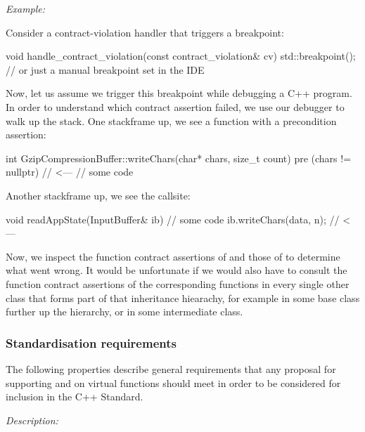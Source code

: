 \emph{Example:}

Consider a contract-violation handler that triggers a breakpoint:

\begin{codeblock}
void handle_contract_violation(const contract_violation& cv) {
    std::breakpoint(); // or just a manual breakpoint set in the IDE
}
\end{codeblock}

Now, let us assume we trigger this breakpoint while debugging a C++ program. In order to understand which contract assertion failed, we use our debugger to walk up the stack.  One stackframe up, we see a function with a precondition assertion:

\begin{codeblock}
int GzipCompressionBuffer::writeChars(char* chars, size_t count)
pre (chars != nullptr) {   // <---
  // some code
}
\end{codeblock}

Another stackframe up, we see the callsite:

\begin{codeblock}
void readAppState(InputBuffer& ib) {
  // some code
  ib.writeChars(data, n);   // <---
}
\end{codeblock}

Now, we inspect the function contract assertions of \allowbreak{} and those of \allowbreak{} to determine what went wrong. It would be unfortunate if we would also have to consult the function contract assertions of the corresponding functions in every single other class that forms part of that inheritance hiearachy, for example \allowbreak{} in some base class further up the hierarchy, or \allowbreak{} in some intermediate class.

\subsubsection{Standardisation requirements}

The following properties describe general requirements that any proposal for supporting  and  on virtual functions should meet in order to be considered for inclusion in the C++ Standard.


\emph{Description:}

